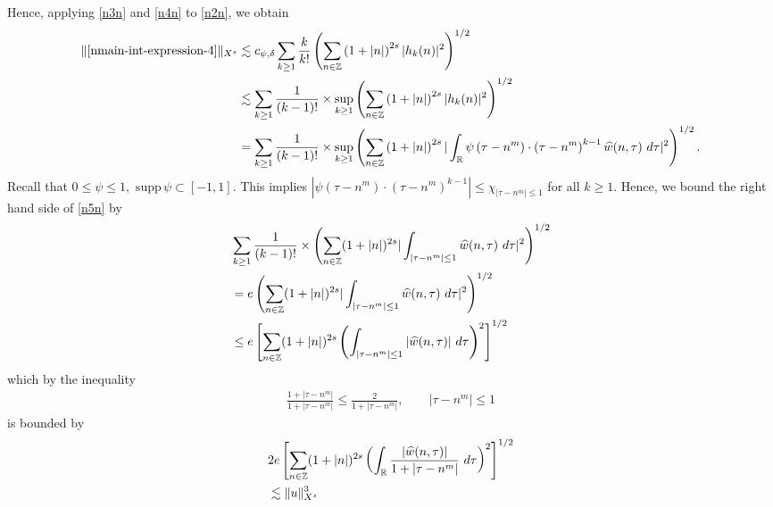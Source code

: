 %
%
Hence, applying \eqref{n3n} and \eqref{n4n} to \eqref{n2n}, we obtain
%
\begin{equation}
	\label{n5n}
	\begin{split}
		\|\eqref{nmain-int-expression-4} \|_{X^s}
		& \lesssim
    c_{\psi, \delta}\sum_{k \ge 1} \frac{k}{k!} \left( \sum_{n \in \mathbb{Z}} \left (1 + |n| \right )^{2s} | h_k(n) |^2 
		\right)^{1/2}
		\\
		& \lesssim \sum_{k \ge 1} \frac{1}{(k-1)!}
		\times \sup_{k \ge 1} \left( \sum_{n \in \mathbb{Z}} \left (1 + |n| \right )^{2s} | 
		h_k(n) |^2 \right)^{1/2}
		\\
		& = \sum_{k \ge 1} \frac{1}{(k-1)!} \times \sup_{k \ge 1} 
		\left( \sum_{n \in \mathbb{Z}} \left (1 + |n| \right )^{2s} |\int_{\mathbb{R}} 
		\psi\left( \tau - n^{m } \right) \cdot \left( \tau - n^{m } 
    \right)^{k -1} \widehat{w}(n, \tau) \ d \tau|^{2} \right)^{1/2}.
    	\end{split}
\end{equation}
%
Recall that $0 \le \psi \le 1, \text{ supp} \, \psi \subset [-1,1 ]$. 
This implies $| \psi\left( \tau - n^{m } \right) \cdot \left( \tau - n^{m } \right)^{k 
-1} | \le \chi_{| \tau - n^{m } | \le 1}$ for all $k \ge 1$. Hence, we bound the
right hand side of \eqref{n5n} by
%
\begin{equation*}
	\begin{split}
		& \sum_{k \ge 1} \frac{1}{(k-1)!} \times \left( \sum_{n \in \mathbb{Z}} (1 + | n |)^{2s}| 
		\int_{| \tau - n^{m}  |\le 1}  \widehat{w}(n, \tau) \ d \tau |^2 
		\right)^{1/2}
    \\
    & = e \left( \sum_{n \in \mathbb{Z}} (1 + | n |)^{2s}| 
		\int_{| \tau - n^{m}  |\le 1}  \widehat{w}(n, \tau) \ d \tau |^2 
		\right)^{1/2}
    \\
    & \le e \left[ \sum_{n \in \mathbb{Z}} (1 + | n |)^{2s}\left (  
		\int_{| \tau - n^{m}  |\le 1} | \widehat{w}(n, \tau) | \ d \tau \right ) ^2 
		\right]^{1/2}
	\end{split}
\end{equation*}
%
which by the inequality
%
\begin{equation*}
	\begin{split}
		\frac{1 + | \tau - n^{m } |}{1 + | \tau  - n^{m } |} \le 
		\frac{2}{1 + | \tau - n^{m } |}, \qquad | \tau - n^{m }  | \le 1
	\end{split}
\end{equation*}
%
is bounded by 
%
\begin{equation}
\label{nmain-int4-est-X-s-part}
	\begin{split}
		& 2e \left[ \sum_{n \in \mathbb{Z}} (1 + | n |)^{2s}\left ( \int_{\mathbb{R}}
		\frac{|\widehat{w}(n, \tau)|}{1 + | \tau - n^{m } |} \ d \tau \right ) ^2 
		\right]^{1/2} \\
		& \lesssim \|u\|_{X^s}^3
	\end{split}
\end{equation}

